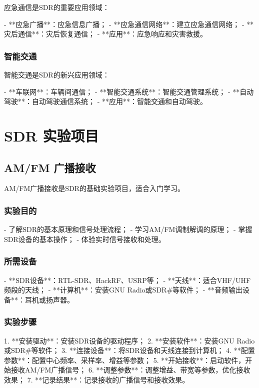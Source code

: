 ﻿\documentclass[UTF8]{ctexbook}
\begin{document}
应急通信是SDR的重要应用领域：

- **应急广播**：应急信息广播；
- **应急通信网络**：建立应急通信网络；
- **灾后通信**：灾后恢复通信；
- **应用**：应急响应和灾害救援。

\subsection{智能交通}

智能交通是SDR的新兴应用领域：

- **车联网**：车辆间通信；
- **智能交通系统**：智能交通管理系统；
- **自动驾驶**：自动驾驶通信系统；
- **应用**：智能交通和自动驾驶。

\chapter{SDR 实验项目}

\section{AM/FM 广播接收}

AM/FM广播接收是SDR的基础实验项目，适合入门学习。

\subsection{实验目的}

- 了解SDR的基本原理和信号处理流程；
- 学习AM/FM调制解调的原理；
- 掌握SDR设备的基本操作；
- 体验实时信号接收和处理。

\subsection{所需设备}

- **SDR设备**：RTL-SDR、HackRF、USRP等；
- **天线**：适合VHF/UHF频段的天线；
- **计算机**：安装GNU Radio或SDR\#等软件；
- **音频输出设备**：耳机或扬声器。

\subsection{实验步骤}

1. **安装驱动**：安装SDR设备的驱动程序；
2. **安装软件**：安装GNU Radio或SDR\#等软件；
3. **连接设备**：将SDR设备和天线连接到计算机；
4. **配置参数**：配置中心频率、采样率、增益等参数；
5. **开始接收**：启动软件，开始接收AM/FM广播信号；
6. **调整参数**：调整增益、带宽等参数，优化接收效果；
7. **记录结果**：记录接收的广播信号和接收效果。
\end{document}
